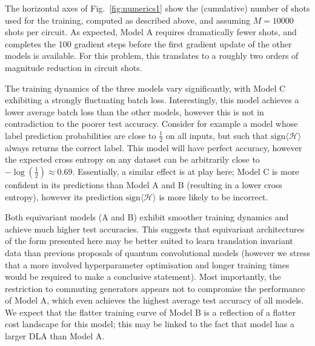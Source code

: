 \documentclass[a4paper,twocolumn,11pt,accepted=2025-09-06]{quantumarticle}
\renewcommand{\vec}{\boldsymbol}
\begin{document}
\begin{table}
\begin{center}
\end{center}
\caption{Specifications and resource requirements for each model for the 16-qubit classification problem we consider. $n$ is the number of trainable parameters, and \# circuits is the number of unique circuits that need to be evaluated in order to estimate the gradient for a given input $\vec{x}$.}  \label{tab:model_specs}
\end{table}

The horizontal axes of Fig.\ \ref{fig:numerics1} show the (cumulative) number of shots used for the training, computed as described above, and assuming $M=10000$ shots per circuit. As expected, Model A requires dramatically fewer shots, and completes the 100 gradient steps before the first gradient update of the other models is available. For this problem, this translates to a roughly two orders of magnitude reduction in circuit shots. 

The training dynamics of the three models vary significantly, with Model C exhibiting a strongly fluctuating batch loss. Interestingly, this model achieves a lower average batch loss than the other models, however this is not in contradiction to the poorer test accuracy. Consider for example a model whose label prediction probabilities are close to $\frac{1}{2}$ on all inputs, but such that $\text{sign} \langle \mathcal{H} \rangle$ always returns the correct label. This model will have perfect accuracy, however the expected cross entropy on any dataset can be arbitrarily close to $-\log(\frac{1}{2})\approx 0.69$. Essentially, a similar effect is at play here; Model C is more confident in its predictions than Model A and B (resulting in a lower cross entropy), however its prediction $\text{sign} \langle \mathcal{H} \rangle$ is more likely to be incorrect.

Both equivariant models (A and B) exhibit smoother training dynamics and achieve much higher test accuracies. This suggests that equivariant architectures of the form presented here may be better suited to learn translation invariant data than previous proposals of quantum convolutional models (however we stress that a more involved hyperparameter optimisation and longer training times would be required to make a conclusive statement). Most importantly, the restriction to commuting generators appears not to compromise the performance of Model A, which even achieves the highest average test accuracy of all models. We expect that the flatter training curve of Model B is a reflection of a flatter cost landscape for this model; this may be linked to the fact that model has a larger DLA than Model A. 
\end{document}

